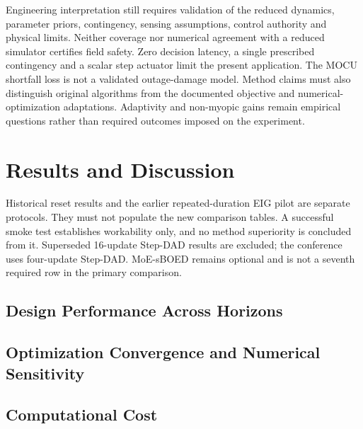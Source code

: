 \documentclass[journal]{IEEEtran}
\begin{document}
Engineering interpretation still requires validation of the reduced dynamics,
parameter priors, contingency, sensing assumptions, control authority and
physical limits. Neither coverage nor numerical agreement with a reduced
simulator certifies field safety. Zero decision latency, a single prescribed
contingency and a scalar step actuator limit the present application.
The MOCU shortfall loss is not a validated outage-damage model. Method claims
must also distinguish original algorithms from the documented objective and
numerical-optimization adaptations. Adaptivity and non-myopic gains remain
empirical questions rather than required outcomes imposed on the experiment.

\section{Results and Discussion}
\label{sec:results}
Historical reset results and the earlier repeated-duration EIG pilot are
separate protocols. They must not populate the new comparison tables. A
successful smoke test establishes workability only, and no method superiority
is concluded from it. Superseded 16-update Step-DAD results are excluded;
the conference uses four-update Step-DAD. MoE-sBOED remains optional and
is not a seventh required row in the primary comparison.
\subsection{Design Performance Across Horizons}
\subsection{Optimization Convergence and Numerical Sensitivity}
\subsection{Computational Cost}
\end{document}
